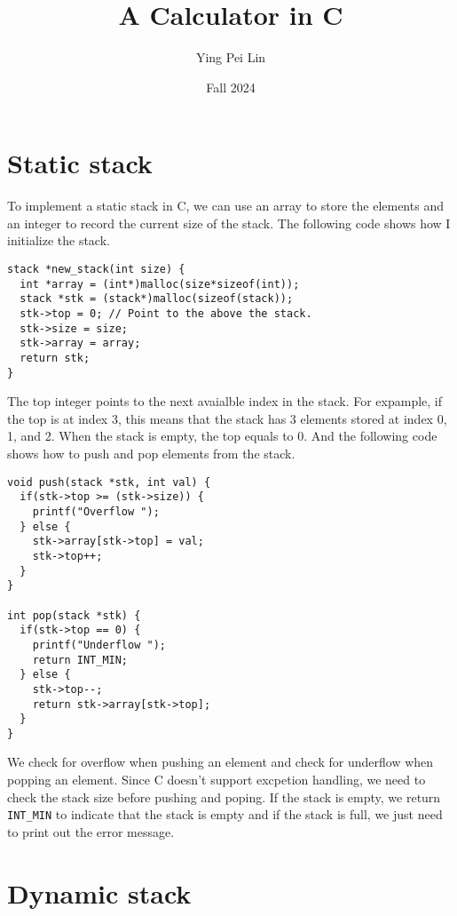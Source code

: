 \documentclass[a4paper,11pt]{article}
\begin{document}
\title{
    \textbf{A Calculator in C}
}
\author{Ying Pei Lin}
\date{Fall 2024}

\maketitle

\section*{Static stack}

To implement a static stack in C, we can use an array to store the elements and an integer to record
the current size of the stack. The following code shows how I initialize the stack. 

\begin{verbatim}
stack *new_stack(int size) {
  int *array = (int*)malloc(size*sizeof(int));
  stack *stk = (stack*)malloc(sizeof(stack));
  stk->top = 0; // Point to the above the stack.
  stk->size = size;
  stk->array = array;
  return stk;
}
\end{verbatim}

The top integer points to the next avaialble index in the stack. For expample, if the top is 
at index 3, this means that the stack has 3 elements stored at index 0, 1, and 2. When the stack
is empty, the top equals to 0. And the following code shows how to push and pop elements from
the stack.

\begin{verbatim}
void push(stack *stk, int val) {
  if(stk->top >= (stk->size)) {
    printf("Overflow ");
  } else {
    stk->array[stk->top] = val;
    stk->top++;
  }
}

int pop(stack *stk) {
  if(stk->top == 0) {
    printf("Underflow ");
    return INT_MIN;
  } else {
    stk->top--;
    return stk->array[stk->top];
  }
}
\end{verbatim}

We check for overflow when pushing an element and check for underflow when popping an element.
Since C doesn't support excpetion handling, we need to check the stack size before pushing 
and poping. If the stack is empty, we return {\tt INT\_MIN} to indicate that the stack is empty and
if the stack is full, we just need to print out the error message.

\section*{Dynamic stack}
\end{document}
